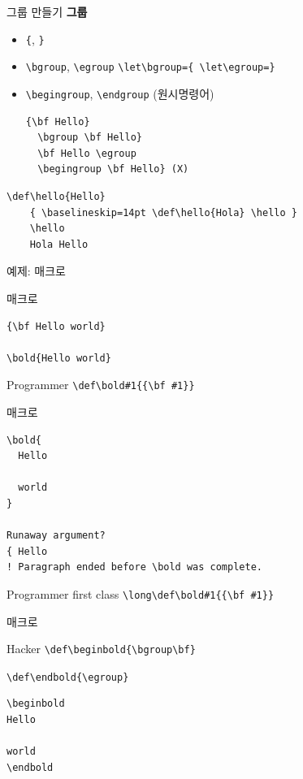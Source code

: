 \documentclass{beamer}
\begin{document}
%
\begin{frame}[fragile]{그룹 만들기}
  \textbf{\alert{그룹}}
  \begin{itemize}
  \item \verb+{+, \verb+}+
  \item \verb+\bgroup+, \verb+\egroup+
    {\color{blue}\small \verb+\let\bgroup={ \let\egroup=}+}
  \item \verb+\begingroup+, \verb+\endgroup+ (원시명령어)
    \medskip
    \begin{Verbatim}[fontsize=\small]
  {\bf Hello}
  \bgroup \bf Hello}
  \bf Hello \egroup
  \begingroup \bf Hello} (X)
    \end{Verbatim}
  \end{itemize}
  \begin{Verbatim}[fontsize=\small, formatcom=\color{blue}]
    \def\hello{Hello}
    { \baselineskip=14pt \def\hello{Hola} \hello }
    \hello
    Hola Hello
  \end{Verbatim}
\end{frame}


%
\begin{frame}[standout]
  예제: \texttt{\string\bold} 매크로
\end{frame}


%
\begin{frame}[fragile]{\texttt{\string\bold} 매크로}
  \begin{Verbatim}[formatcom=\color{blue}]
{\bf Hello world}
    
\bold{Hello world}
  \end{Verbatim}
  \begin{alertblock}{Programmer}
    \verb+\def\bold#1{{\bf #1}}+
  \end{alertblock}
\end{frame}


%
\begin{frame}[fragile]{\texttt{\string\bold} 매크로}
  \begin{Verbatim}[fontsize=\small, formatcom=\color{blue}]
\bold{
  Hello

  world
}

Runaway argument?
{ Hello
! Paragraph ended before \bold was complete.
  \end{Verbatim}
  \begin{alertblock}{Programmer first class}
    \verb+\long\def\bold#1{{\bf #1}}+
  \end{alertblock}
\end{frame}


%
\begin{frame}[fragile]{\texttt{\string\bold} 매크로}
  \begin{alertblock}{Hacker}
    \verb+\def\beginbold{\bgroup\bf}+
    
    \verb+\def\endbold{\egroup}+
  \end{alertblock}

  \begin{Verbatim}[fontsize=\small, formatcom=\color{blue}]
\beginbold
Hello

world
\endbold
  \end{Verbatim}
\end{frame}
\end{document}
